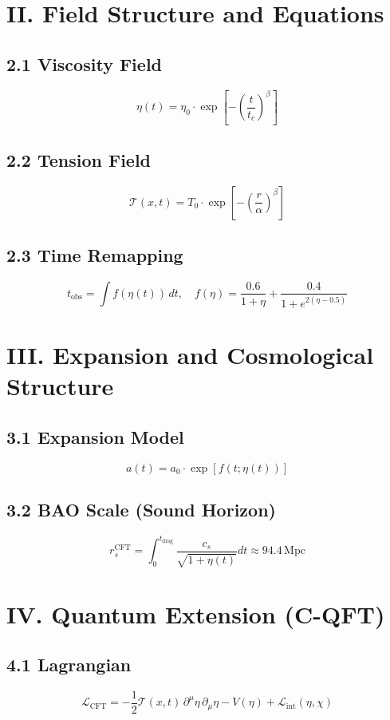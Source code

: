\documentclass[12pt]{article}
\begin{document}
\section*{II. Field Structure and Equations}

\subsection*{2.1 Viscosity Field}
\[
\eta(t) = \eta_0 \cdot \exp\left[ -\left( \frac{t}{t_c} \right)^\beta \right]
\]

\subsection*{2.2 Tension Field}
\[
\mathcal{T}(x, t) = T_0 \cdot \exp\left[ -\left( \frac{r}{\alpha} \right)^\beta \right]
\]

\subsection*{2.3 Time Remapping}
\[
t_{\text{obs}} = \int f(\eta(t)) \, dt, \quad f(\eta) = \frac{0.6}{1 + \eta} + \frac{0.4}{1 + e^{2(\eta - 0.5)}}
\]

\section*{III. Expansion and Cosmological Structure}

\subsection*{3.1 Expansion Model}
\[
a(t) = a_0 \cdot \exp\left[ f(t; \eta(t)) \right]
\]

\subsection*{3.2 BAO Scale (Sound Horizon)}
\[
r_s^{\text{CFT}} = \int_0^{t_{\text{drag}}} \frac{c_s}{\sqrt{1 + \eta(t)}} dt \approx 94.4 \, \text{Mpc}
\]

\section*{IV. Quantum Extension (C-QFT)}

\subsection*{4.1 Lagrangian}
\[
\mathcal{L}_{\text{CFT}} = -\frac{1}{2} \mathcal{T}(x,t) \, \partial^\mu \eta \, \partial_\mu \eta - V(\eta) + \mathcal{L}_{\text{int}}(\eta, \chi)
\]
\end{document}
